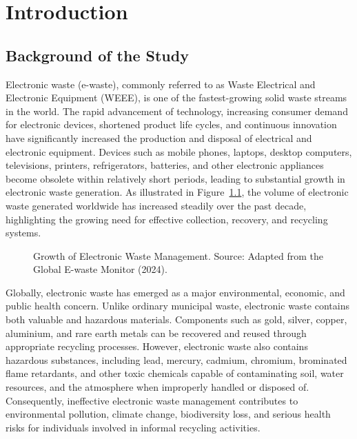 \chapter{Introduction}
\label{ch:introduction}

\section{Background of the Study}
\label{sec:background}

Electronic waste (e-waste), commonly referred to as Waste Electrical and Electronic
Equipment (WEEE), is one of the fastest-growing solid waste streams in the world. The
rapid advancement of technology, increasing consumer demand for electronic devices,
shortened product life cycles, and continuous innovation have significantly increased
the production and disposal of electrical and electronic equipment. Devices such as
mobile phones, laptops, desktop computers, televisions, printers, refrigerators,
batteries, and other electronic appliances become obsolete within relatively short
periods, leading to substantial growth in electronic waste generation. As illustrated in
Figure~\ref{fig:ewaste-growth}, the volume of electronic waste generated worldwide
has increased steadily over the past decade, highlighting the growing need for
effective collection, recovery, and recycling systems.

\begin{figure}[H]
  \centering
  \caption{Growth of Electronic Waste Management. Source: Adapted from the Global E-waste Monitor (2024).}
  \label{fig:ewaste-growth}
\end{figure}

Globally, electronic waste has emerged as a major environmental, economic, and
public health concern. Unlike ordinary municipal waste, electronic waste contains both
valuable and hazardous materials. Components such as gold, silver, copper,
aluminium, and rare earth metals can be recovered and reused through appropriate
recycling processes. However, electronic waste also contains hazardous substances,
including lead, mercury, cadmium, chromium, brominated flame retardants, and other
toxic chemicals capable of contaminating soil, water resources, and the atmosphere
when improperly handled or disposed of. Consequently, ineffective electronic waste
management contributes to environmental pollution, climate change, biodiversity
loss, and serious health risks for individuals involved in informal recycling activities.

